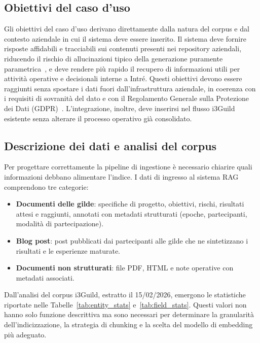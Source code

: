 \subsection{Obiettivi del caso d'uso}

Gli obiettivi del caso d'uso derivano direttamente dalla natura del corpus e dal
contesto aziendale in cui il sistema deve essere inserito. Il sistema deve
fornire risposte affidabili e tracciabili sui contenuti presenti nei repository
aziendali, riducendo il rischio di allucinazioni tipico della generazione
puramente parametrica~\cite{lewis2020retrieval}, e deve rendere più rapido il recupero
di informazioni utili per attività operative e decisionali interne a Intré.
Questi obiettivi devono essere raggiunti senza spostare i dati fuori
dall'infrastruttura aziendale, in coerenza con i requisiti di sovranità del dato
e con il Regolamento Generale sulla Protezione dei Dati
(GDPR)~\cite{gdpr2016}. L'integrazione, inoltre, deve inserirsi nel flusso
i3Guild esistente senza alterare il processo operativo già consolidato.

\subsection{Descrizione dei dati e analisi del corpus}
\label{subsec:data_analysis}

Per progettare correttamente la pipeline di ingestione è necessario chiarire
quali informazioni debbano alimentare l'indice. I dati di ingresso al sistema
RAG comprendono tre categorie:

\begin{itemize}
  \item \textbf{Documenti delle gilde}: specifiche di progetto, obiettivi,
    rischi, risultati attesi e raggiunti, annotati con metadati strutturati
    (epoche, partecipanti, modalità di partecipazione).
  \item \textbf{Blog post}: post pubblicati dai partecipanti alle gilde che ne 
    sintetizzano i risultati e le esperienze maturate.
  \item \textbf{Documenti non strutturati}: file PDF, HTML e note operative con
    metadati associati.
\end{itemize}

Dall'analisi del corpus i3Guild, estratto il 15/02/2026, emergono le
statistiche riportate nelle Tabelle~\ref{tab:entity_stats}
e~\ref{tab:field_stats}. Questi valori non hanno solo funzione descrittiva ma sono necessari 
per determinare la granularità dell'indicizzazione, la strategia di chunking e la
scelta del modello di embedding più adeguato.


